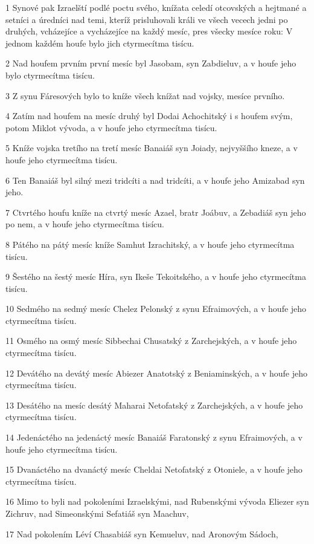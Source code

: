 \par 1 Synové pak Izraelští podlé poctu svého, knížata celedí otcovských a hejtmané a setníci a úredníci nad temi, kteríž prisluhovali králi ve všech vecech jedni po druhých, vcházejíce a vycházejíce na každý mesíc, pres všecky mesíce roku: V jednom každém houfe bylo jich ctyrmecítma tisícu.
\par 2 Nad houfem prvním první mesíc byl Jasobam, syn Zabdieluv, a v houfe jeho bylo ctyrmecítma tisícu.
\par 3 Z synu Fáresových bylo to kníže všech knížat nad vojsky, mesíce prvního.
\par 4 Zatím nad houfem na mesíc druhý byl Dodai Achochitský i s houfem svým, potom Miklot vývoda, a v houfe jeho ctyrmecítma tisícu.
\par 5 Kníže vojska tretího na tretí mesíc Banaiáš syn Joiady, nejvyššího kneze, a v houfe jeho ctyrmecítma tisícu.
\par 6 Ten Banaiáš byl silný mezi tridcíti a nad tridcíti, a v houfe jeho Amizabad syn jeho.
\par 7 Ctvrtého houfu kníže na ctvrtý mesíc Azael, bratr Joábuv, a Zebadiáš syn jeho po nem, a v houfe jeho ctyrmecítma tisícu.
\par 8 Pátého na pátý mesíc kníže Samhut Izrachitský, a v houfe jeho ctyrmecítma tisícu.
\par 9 Šestého na šestý mesíc Híra, syn Ikeše Tekoitského, a v houfe jeho ctyrmecítma tisícu.
\par 10 Sedmého na sedmý mesíc Chelez Pelonský z synu Efraimových, a v houfe jeho ctyrmecítma tisícu.
\par 11 Osmého na osmý mesíc Sibbechai Chusatský z Zarchejských, a v houfe jeho ctyrmecítma tisícu.
\par 12 Devátého na devátý mesíc Abiezer Anatotský z Beniaminských, a v houfe jeho ctyrmecítma tisícu.
\par 13 Desátého na mesíc desátý Maharai Netofatský z Zarchejských, a v houfe jeho ctyrmecítma tisícu.
\par 14 Jedenáctého na jedenáctý mesíc Banaiáš Faratonský z synu Efraimových, a v houfe jeho ctyrmecítma tisícu.
\par 15 Dvanáctého na dvanáctý mesíc Cheldai Netofatský z Otoniele, a v houfe jeho ctyrmecítma tisícu.
\par 16 Mimo to byli nad pokoleními Izraelskými, nad Rubenskými vývoda Eliezer syn Zichruv, nad Simeonskými Sefatiáš syn Maachuv,
\par 17 Nad pokolením Léví Chasabiáš syn Kemueluv, nad Aronovým Sádoch,
